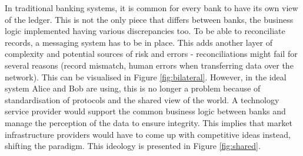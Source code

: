 \documentclass[12pt,twoside]{article}
\begin{document}
In traditional banking systems, it is common for every bank to have its own view of the ledger. This is not the only piece that differs between banks, the business logic implemented having various discrepancies too. To be able to reconciliate records, a messaging system has to be in place. This adds another layer of complexity and potential sources of risk and errors - reconciliations might fail for several reasons (record mismatch, human errors when transferring data over the network). This can be visualised in Figure \ref{fig:bilateral}. However, in the ideal system Alice and Bob are using, this is no longer a problem because of standardisation of protocols and the shared view of the world. A technology service provider would support the common business logic between banks and manage the perception of the data to ensure integrity. This implies that market infrastructure providers would have to come up with competitive ideas instead, shifting the paradigm. This ideology is presented in Figure \ref{fig:shared}.
\end{document}
